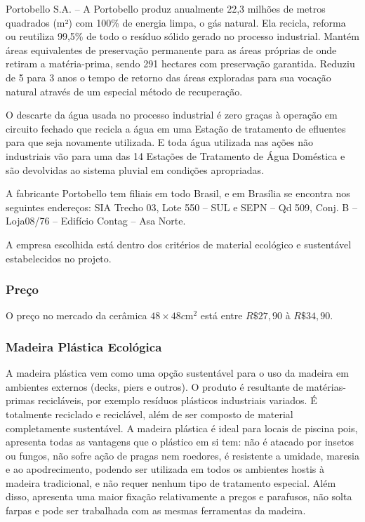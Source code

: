 Portobello S.A. – A Portobello produz anualmente 22,3 milhões de metros quadrados (m²) com 100\% de energia limpa, o gás natural. Ela recicla, reforma ou reutiliza 99,5\% de todo o resíduo sólido gerado no processo industrial. Mantém áreas equivalentes de preservação permanente para as áreas próprias de onde retiram a matéria-prima, sendo 291 hectares com preservação garantida. Reduziu de 5 para 3 anos o tempo de retorno das áreas exploradas para sua vocação natural através de um especial método de recuperação.

O descarte da água usada no processo industrial é zero graças à operação em circuito fechado que recicla a água em uma Estação de tratamento de efluentes para que seja novamente utilizada. E toda água utilizada nas ações não industriais vão para uma das 14 Estações de Tratamento de Água Doméstica e são devolvidas ao sistema pluvial em condições apropriadas.

A fabricante Portobello tem filiais em todo Brasil, e em Brasília se encontra nos seguintes endereços: SIA Trecho 03, Lote 550 – SUL e SEPN – Qd 509, Conj. B – Loja08/76 – Edifício Contag – Asa Norte.

A empresa escolhida está dentro dos critérios de material ecológico e sustentável estabelecidos no projeto.


\subsubsection*{\textbf{Preço}}
	
	O preço no mercado da cerâmica $48\times48 c\si{\meter}^{2}$ está entre $R\$ 27,90$ à $R\$ 34,90$.\cite{precoCeramica}


\subsubsection*{\textbf{Madeira Plástica Ecológica}}
	
	
	A madeira plástica vem como uma opção sustentável para o uso da madeira em ambientes externos (decks, piers e outros). O produto é resultante de matérias-primas recicláveis, por exemplo resíduos plásticos industriais variados\cite{EcoCasa}. É totalmente reciclado e reciclável, além de ser composto de material completamente sustentável\cite{ReWood}. A madeira plástica é ideal para locais de piscina pois, apresenta todas as vantagens que o plástico em si tem: não é atacado por insetos ou fungos, não sofre ação de pragas nem roedores, é resistente a umidade, maresia e ao apodrecimento, podendo ser utilizada em todos os ambientes hostis à madeira tradicional, e não requer nenhum tipo de tratamento especial. Além disso, apresenta uma maior fixação relativamente a pregos e parafusos, não solta farpas e pode ser trabalhada com as mesmas ferramentas da madeira\cite{ReWood}.

